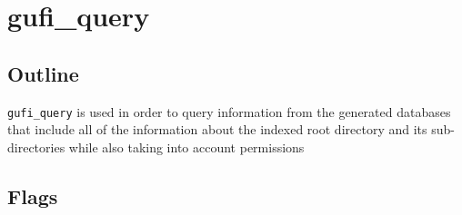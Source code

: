 \section{gufi\_query}

\subsection{Outline}

\texttt{gufi\_query} is used in order to query information from the generated databases that include all of the information about the indexed root directory and its sub-directories while also taking into account permissions
\subsection{Flags}

